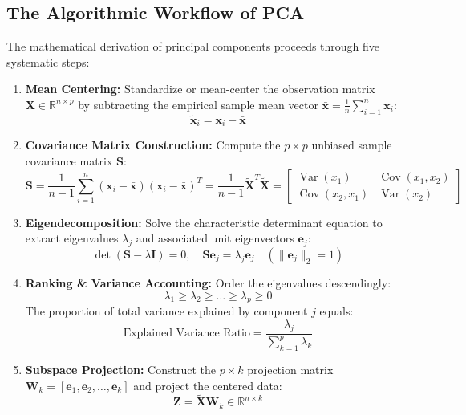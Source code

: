 \subsection{The Algorithmic Workflow of PCA}
The mathematical derivation of principal components proceeds through five systematic steps:
\begin{enumerate}
    \item \textbf{Mean Centering:} Standardize or mean-center the observation matrix $\mathbf{X} \in \mathbb{R}^{n \times p}$ by subtracting the empirical sample mean vector $\bar{\mathbf{x}} = \frac{1}{n} \sum_{i=1}^n \mathbf{x}_i$:
    \begin{equation}
        \tilde{\mathbf{x}}_i = \mathbf{x}_i - \bar{\mathbf{x}}
    \end{equation}
    \item \textbf{Covariance Matrix Construction:} Compute the $p \times p$ unbiased sample covariance matrix $\mathbf{S}$:
    \begin{equation}
        \mathbf{S} = \frac{1}{n - 1} \sum_{i=1}^n (\mathbf{x}_i - \bar{\mathbf{x}})(\mathbf{x}_i - \bar{\mathbf{x}})^T = \frac{1}{n - 1} \tilde{\mathbf{X}}^T \tilde{\mathbf{X}} = \begin{bmatrix}
        \operatorname{Var}(x_1) & \operatorname{Cov}(x_1, x_2) \\
        \operatorname{Cov}(x_2, x_1) & \operatorname{Var}(x_2)
        \end{bmatrix}
    \end{equation}
    \item \textbf{Eigendecomposition:} Solve the characteristic determinant equation to extract eigenvalues $\lambda_j$ and associated unit eigenvectors $\mathbf{e}_j$:
    \begin{equation}
        \det(\mathbf{S} - \lambda \mathbf{I}) = 0, \quad \mathbf{S} \mathbf{e}_j = \lambda_j \mathbf{e}_j \quad (\|\mathbf{e}_j\|_2 = 1)
    \end{equation}
    \item \textbf{Ranking \& Variance Accounting:} Order the eigenvalues descendingly:
    \begin{equation}
        \lambda_1 \ge \lambda_2 \ge \dots \ge \lambda_p \ge 0
    \end{equation}
    The proportion of total variance explained by component $j$ equals:
    \begin{equation}
        \text{Explained Variance Ratio} = \frac{\lambda_j}{\sum_{k=1}^p \lambda_k}
    \end{equation}
    \item \textbf{Subspace Projection:} Construct the $p \times k$ projection matrix $\mathbf{W}_k = [\mathbf{e}_1, \mathbf{e}_2, \dots, \mathbf{e}_k]$ and project the centered data:
    \begin{equation}
        \mathbf{Z} = \tilde{\mathbf{X}} \mathbf{W}_k \in \mathbb{R}^{n \times k}
    \end{equation}
\end{enumerate}

